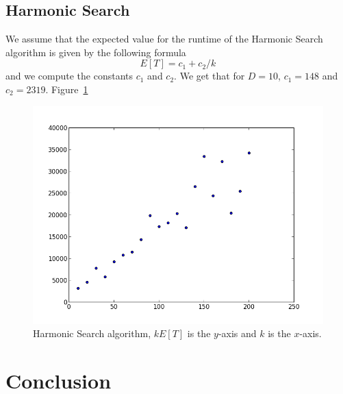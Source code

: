 \documentclass[runningheads,a4paper]{llncs}
\begin{document}
\subsection{Harmonic Search}

We assume that the expected value for the runtime of the Harmonic Search algorithm is given by the following formula
\[ E[T] = c_1 + c_2 / k \]
and we compute the constants $c_1$ and $c_2$. We get that for $D=10$, $c_1 = 148$ and $c_2 = 2319$. Figure~\ref{harmonic}

\begin{figure}
\centering
\label{harmonic}
\includegraphics[width=0.5\linewidth]{Harmonic.png}
\caption{Harmonic Search algorithm, $kE[T]$ is the $y$-axis and $k$ is the $x$-axis.}
\end{figure}

\section{Conclusion}
\label{conclusion}



\end{document}
